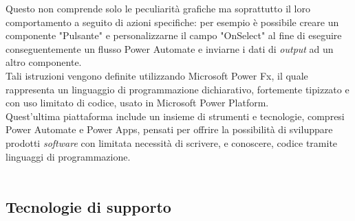 Questo non comprende solo le peculiarità grafiche ma soprattutto il loro comportamento a seguito di azioni specifiche: per esempio è possibile creare un componente "Pulsante" e personalizzarne il campo "OnSelect" al fine di eseguire conseguentemente un flusso Power Automate e inviarne i dati di \emph{output} ad un altro componente.\\
Tali istruzioni vengono definite utilizzando Microsoft Power Fx, il quale rappresenta un linguaggio di programmazione dichiarativo, fortemente tipizzato e con uso limitato di codice, usato in Microsoft Power Platform.\\
Quest'ultima piattaforma include un insieme di strumenti e tecnologie, compresi Power Automate e Power Apps, pensati per offrire la possibilità di sviluppare prodotti \emph{software} con limitata necessità di scrivere, e conoscere, codice tramite linguaggi di programmazione.\\\\

\subsection{Tecnologie di supporto}
